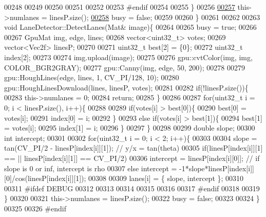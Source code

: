 \begin{DoxyCode}
00248 
00249 
00250 
00251 
00252 
00253         \textcolor{preprocessor}{#}\textcolor{preprocessor}{endif}
00254 
00255     \}
00256 
\hyperlink{LaneDetection_8cpp_a9a499e6ee417732a06f9d3a3f6433546}{00257}     \textcolor{keyword}{this}->numlanes = linesP.size();
\hyperlink{LaneDetection_8cpp_ab5707289495a33e90ac7ce232adcca4c}{00258}     busy = \textcolor{keyword}{false};
00259 
00260 \}
00261 
00262 
00263 \textcolor{keywordtype}{void} LaneDetector::DetectLanes(Mat& image)\{
00264 
00265     busy = \textcolor{keyword}{true};
00266 
00267     GpuMat img, edge, lines;
00268     vector<uint32\_t> votes;
00269     vector<Vec2f> linesP;
00270 
00271     uint32\_t best[2] = \{0\};
00272     uint32\_t index[2];
00273 
00274     img.upload(image);
00275 
00276     gpu::cvtColor(img, img, COLOR\_BGR2GRAY);
00277     gpu::Canny(img, edge, 50, 200);
00278 
00279     gpu::HoughLines(edge, lines, 1,  CV\_PI/128, 10);
00280     gpu::HoughLinesDownload(lines, linesP, votes);
00281 
00282     \textcolor{keywordflow}{if}(!linesP.size())\{
00283         \textcolor{keyword}{this}->numlanes = 0;
00284         \textcolor{keywordflow}{return};
00285     \}
00286 
00287     \textcolor{keywordflow}{for}(uint32\_t i = 0; i < linesP.size(), i++)\{
00288 
00289         \textcolor{keywordflow}{if}(votes[i] > best[0])\{
00290             best[0] = votes[i];
00291             index[0] = i;
00292         \}
00293         \textcolor{keywordflow}{else} \textcolor{keywordflow}{if}(votes[i] > best[1])\{
00294             best[1] = votes[i];
00295             index[1] = i;
00296         \}
00297     \}
00298 
00299     \textcolor{keywordtype}{double} slope;
00300     \textcolor{keywordtype}{int} intercept;
00301 
00302     \textcolor{keywordflow}{for}(uint32\_t i = 0; i < 2; i++)\{
00303 
00304         slope = tan(CV\_PI/2 - linesP[index[i]][1]); \textcolor{comment}{// y/x = tan(theta)}
00305         \textcolor{keywordflow}{if}(linesP[index[i]][1] == || linesP[index[i][1]] == CV\_PI/2)
00306             intercept = linesP[index[i][0]];  \textcolor{comment}{// if slope is 0 or inf, intercept is rho}
00307         \textcolor{keywordflow}{else} intercept = -1*slope*linesP[index[i]][0]/cos(linesP[index[i]][1]);
00308 
00309         lanes[i] = \{ slope, intercept \};
00310 
00311         \textcolor{preprocessor}{#}\textcolor{preprocessor}{ifdef} \textcolor{preprocessor}{DEBUG}
00312 
00313 
00314 
00315 
00316 
00317         \textcolor{preprocessor}{#}\textcolor{preprocessor}{endif}
00318 
00319     \}
00320 
00321     \textcolor{keyword}{this}->numlanes = linesP.size();
00322     busy = \textcolor{keyword}{false};
00323 
00324 \}
00325 
00326 \textcolor{preprocessor}{#}\textcolor{preprocessor}{endif}
\end{DoxyCode}

